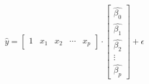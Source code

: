 \documentclass[preview]{standalone}
\begin{document}
\begin{align*}
\hat{y} = \begin{bmatrix} 1 & x_1 & x_2 & \cdots & x_p \end{bmatrix} \cdot \begin{bmatrix} \hat{\beta_0} \\ \hat{\beta_1}\\ \hat{\beta_2} \\ \vdots \\ \hat{\beta_p} \end{bmatrix} + \epsilon
\end{align*}
\end{document}
